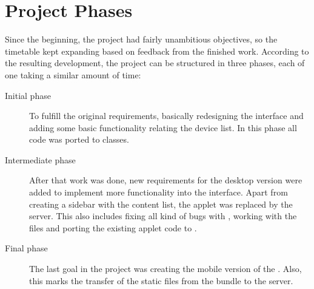 \section{Project Phases} %
\label{sec:phases}

Since the beginning, the project had fairly unambitious objectives, so the timetable kept expanding based on feedback from the finished work.
According to the resulting development, the project can be structured in three phases, each of one taking a similar amount of time:

\begin{description}
  \item[Initial phase] To fulfill the original requirements, basically redesigning the  interface and adding some basic functionality relating the device list.
  In this phase all  code was ported to  classes.
  \item[Intermediate phase] After that work was done, new requirements for the desktop version were added to implement more functionality into the  interface.
  Apart from creating a sidebar with the content list, the applet was replaced by the  server.
  This also includes fixing all kind of bugs with , working with the  files and porting the existing  applet code to .
  \item[Final phase] The last goal in the project was creating the mobile version of the .
  Also, this marks the transfer of the static files from the  bundle to the  server.
\end{description}
